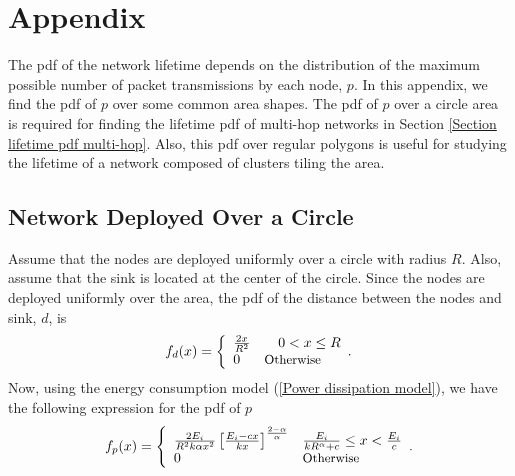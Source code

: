 \documentclass[conference]{IEEEtran}
\begin{document}
\section*{Appendix}\label{Appendix pdf of p}
The pdf of the network lifetime depends on the distribution of the
maximum possible number of packet transmissions by each node, $p$.
In this appendix, we find the pdf of $p$ over some common area
shapes. The pdf of $p$ over a circle area is required for finding
the lifetime pdf of multi-hop networks in Section \ref{Section
lifetime pdf multi-hop}. Also, this pdf over regular polygons is
useful for studying the lifetime of a network composed of clusters
tiling the area.

\subsection{Network Deployed Over a Circle}
Assume that the nodes are deployed uniformly over a circle with radius $R$.
Also, assume that the sink is located at the center of the circle.
Since the nodes are deployed uniformly over the area, the pdf of the
distance between the nodes and sink, $d$, is
\begin{equation}
f_d(x) = \left\{
\begin{array}{ll}
\frac{2x}{R^2}  & \quad 0 < x \leq R\\
0 & \text{\small{Otherwise}}
\end{array}.
\right.
\end{equation}
Now, using the energy consumption model (\ref{Power dissipation
model}), we have the following expression for the pdf of $p$
\begin{align}\label{f_p circle}
f_{p}(x)  = \left\{
\begin{array}{ll}
\frac{2E_i}{R^2 k \alpha x^2} \left[\frac{E_i -
cx}{kx}\right]^{\frac{2-\alpha}{\alpha}}&\frac{E_i}{kR^{\alpha} +
c}\leq x < \frac{E_i}{c}\\
0 & \text{\small{Otherwise}}
\end{array}. \right.
\end{align}
\end{document}

